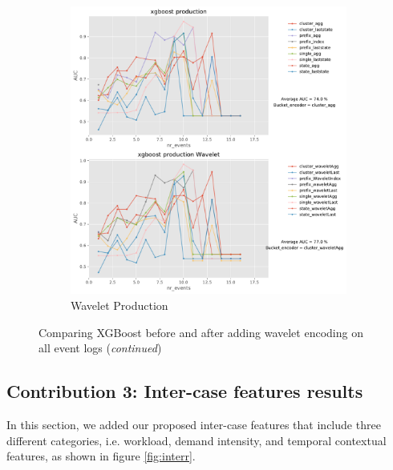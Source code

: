 \begin{figure}[!htbp]
	\begin{subfigure}{0.48\textwidth}
		\includegraphics[width=\linewidth]{images/wavelet/graphs2/production.pdf}
		\caption{Wavelet Production} \label{fig:prow}
	\end{subfigure}\hspace*{\fill}
	\caption{Comparing XGBoost before and after adding wavelet encoding on all event logs (\textit{continued})}
\label{fig:r3w}
\end{figure}


\clearpage

\subsection{Contribution 3: Inter-case features results}
In this section, we added our proposed inter-case features that include three different categories, i.e. workload, demand intensity, and temporal contextual features, as shown in figure \ref{fig:interr}.

